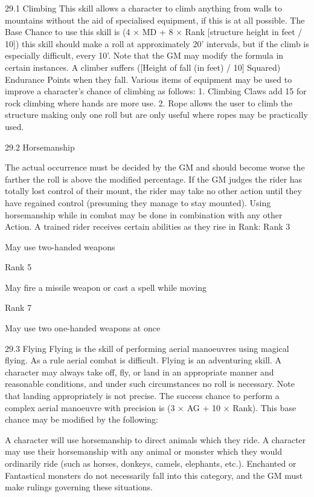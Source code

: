 \documentclass[a4paper]{article}
\begin{document}
\begin{multicols}{3}
29.1 Climbing
This skill allows a character to climb anything
from walls to mountains without the aid of specialised equipment, if this is at all possible. The Base
Chance to use this skill is (4 × MD + 8 × Rank [structure height in feet / 10])%
this skill should make a roll at approximately 20’
intervals, but if the climb is especially difficult,
every 10’. Note that the GM may modify the formula in certain instances.
A climber suffers ([Height of fall (in feet) / 10]
Squared) Endurance Points when they fall.
Various items of equipment may be used to improve a character’s chance of climbing as follows:
1. Climbing Claws add 15%
for rock climbing where hands are more use.
2. Rope allows the user to climb the structure making only one roll but are only useful where ropes
may be practically used.

29.2 Horsemanship

The actual occurrence must be decided by the GM
and should become worse the farther the roll is
above the modified percentage.
If the GM judges the rider has totally lost control
of their mount, the rider may take no other action
until they have regained control (presuming they
manage to stay mounted).
Using horsemanship while in combat may be done
in combination with any other Action. A trained
rider receives certain abilities as they rise in Rank:
Rank
3

May use two-handed weapons

Rank
5

May fire a missile weapon or cast a spell
while moving

Rank
7

May use two one-handed weapons at
once

29.3 Flying
Flying is the skill of performing aerial manoeuvres
using magical flying. As a rule aerial combat is
difficult. Flying is an adventuring skill.
A character may always take off, fly, or land in an
appropriate manner and reasonable conditions, and
under such circumstances no roll is necessary. Note
that landing appropriately is not precise. The success chance to perform a complex aerial manoeuvre with precision is (3 × AG + 10 × Rank). This
base chance may be modified by the following:

A character will use horsemanship to direct animals which they ride. A character may use their
horsemanship with any animal or monster which
they would ordinarily ride (such as horses, donkeys, camels, elephants, etc.). Enchanted or Fantastical monsters do not necessarily fall into this category, and the GM must make rulings governing
these situations.


\end{multicols}
\end{document}
